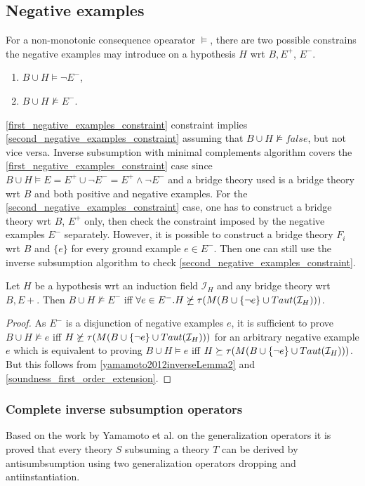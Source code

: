 \subsection{Negative examples}
For a non-monotonic consequence opearator $\models$, there are two possible constrains the negative examples may introduce on a hypothesis $H$ wrt $B, E^+$, $E^-$.
\begin{enumerate}
\item\label{first_negative_examples_constraint} $B \cup H \models \neg E^-$,
\item\label{second_negative_examples_constraint} $B \cup H \not\models E^-$.
\end{enumerate}
\ref{first_negative_examples_constraint} constraint implies \ref{second_negative_examples_constraint} assuming that $B \cup H \not\models false$, but not vice versa. Inverse subsumption with minimal complements algorithm covers the \ref{first_negative_examples_constraint} case since $B \cup H \models E = E^+ \cup \neg E^- = E^+ \land \neg E^-$ and a bridge theory used is a bridge theory wrt $B$ and both positive and negative examples. For the \ref{second_negative_examples_constraint} case, one has to construct a bridge theory wrt $B$, $E^+$ only, then check the constraint imposed by the negative examples $E^-$ separately. However, it is possible to construct a bridge theory $F_i$ wrt $B$ and $\{e\}$ for every ground example $e \in E^-$. Then one can still use the inverse subsumption algorithm to check \ref{second_negative_examples_constraint}.

\begin{proposition}\label{proposition_negative_examples_subsumption}
Let $H$ be a hypothesis wrt an induction field $\mathcal{I}_H$ and any bridge theory wrt $B, E+$. Then $B \cup H \not\models E^-$ iff $\forall e \in E^-. H \not\succeq \tau(M(B \cup \{\neg e\} \cup Taut(\mathcal{I}_H)))$.
\end{proposition}
\begin{proof}
As $E^-$ is a disjunction of negative examples $e$, it is sufficient to prove
$B \cup H \not\models e$ iff
$H \not\succeq \tau(M(B \cup \{\neg e\} \cup Taut(\mathcal{I}_H)))$ for an arbitrary negative example $e$ which is equivalent to proving
$B \cup H \models e$ iff $H \succeq \tau(M(B \cup \{\neg e\} \cup Taut(\mathcal{I}_H)))$. But this follows from \ref{yamamoto2012inverseLemma2} and \ref{soundness_first_order_extension}.
\end{proof}

\subsubsection{Complete inverse subsumption operators}\label{complete_inverse_subsumption_operators}
Based on the work by Yamamoto et al. on the generalization operators\cite{yamamoto2008towards} it is proved that every theory $S$ subsuming a theory $T$ can be derived by antisumbsumption using two generalization operators dropping and antiinstantiation.

